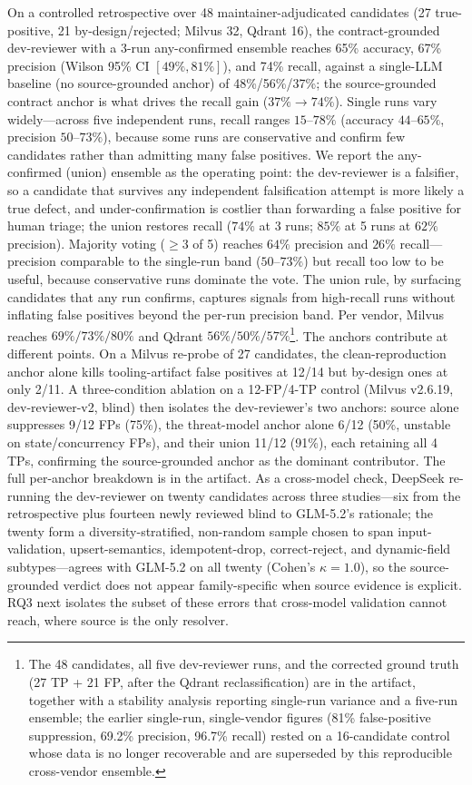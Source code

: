 \documentclass[sigconf]{acmart}
\begin{document}
On a controlled retrospective over 48 maintainer-adjudicated candidates (27 true-positive, 21 by-design/rejected; Milvus 32, Qdrant 16), the contract-grounded dev-reviewer with a 3-run any-confirmed ensemble reaches 65\% accuracy, 67\% precision (Wilson 95\% CI $[49\%, 81\%]$), and 74\% recall, against a single-LLM baseline (no source-grounded anchor) of 48\%/56\%/37\%; the source-grounded contract anchor is what drives the recall gain ($37\%\to74\%$). Single runs vary widely---across five independent runs, recall ranges $15$--$78\%$ (accuracy $44$--$65\%$, precision $50$--$73\%$), because some runs are conservative and confirm few candidates rather than admitting many false positives. We report the any-confirmed (union) ensemble as the operating point: the dev-reviewer is a falsifier, so a candidate that survives any independent falsification attempt is more likely a true defect, and under-confirmation is costlier than forwarding a false positive for human triage; the union restores recall ($74\%$ at 3 runs; $85\%$ at 5 runs at $62\%$ precision). Majority voting ($\ge 3$ of 5) reaches $64\%$ precision and $26\%$ recall---precision comparable to the single-run band ($50$--$73\%$) but recall too low to be useful, because conservative runs dominate the vote. The union rule, by surfacing candidates that any run confirms, captures signals from high-recall runs without inflating false positives beyond the per-run precision band. Per vendor, Milvus reaches $69\%/73\%/80\%$ and Qdrant $56\%/50\%/57\%$\footnote{The 48 candidates, all five dev-reviewer runs, and the corrected ground truth (27 TP + 21 FP, after the Qdrant reclassification) are in the artifact, together with a stability analysis reporting single-run variance and a five-run ensemble; the earlier single-run, single-vendor figures (81\% false-positive suppression, 69.2\% precision, 96.7\% recall) rested on a 16-candidate control whose data is no longer recoverable and are superseded by this reproducible cross-vendor ensemble.}. The anchors contribute at different points. On a Milvus re-probe of 27 candidates, the clean-reproduction anchor alone kills tooling-artifact false positives at 12/14 but by-design ones at only 2/11. A three-condition ablation on a 12-FP/4-TP control (Milvus v2.6.19, dev-reviewer-v2, blind) then isolates the dev-reviewer's two anchors: source alone suppresses 9/12 FPs (75\%), the threat-model anchor alone 6/12 (50\%, unstable on state/concurrency FPs), and their union 11/12 (91\%), each retaining all 4 TPs, confirming the source-grounded anchor as the dominant contributor. The full per-anchor breakdown is in the artifact. As a cross-model check, DeepSeek re-running the dev-reviewer on twenty candidates across three studies---six from the retrospective plus fourteen newly reviewed blind to GLM-5.2's rationale; the twenty form a diversity-stratified, non-random sample chosen to span input-validation, upsert-semantics, idempotent-drop, correct-reject, and dynamic-field subtypes---agrees with GLM-5.2 on all twenty (Cohen's $\kappa = 1.0$), so the source-grounded verdict does not appear family-specific when source evidence is explicit. RQ3 next isolates the subset of these errors that cross-model validation cannot reach, where source is the only resolver.
\end{document}
